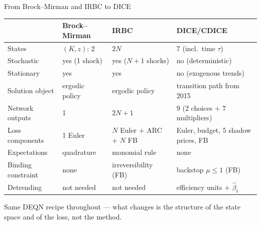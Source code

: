 \documentclass[aspectratio=169,11pt]{beamer}
\newcommand{\emphc}[1]{\textcolor{harvardcrimson}{#1}}
\begin{document}
\begin{frame}{From Brock--Mirman and IRBC to DICE}
\begin{center}
\footnotesize
\setlength{\tabcolsep}{4pt}
\begin{tabular}{llll}
\toprule
& \textbf{Brock--Mirman} & \textbf{IRBC} & \textbf{DICE/CDICE} \\
\midrule
States & $(K, z)$: 2 & $2N$ & 7 (incl.\ time $\tau$) \\
Stochastic & yes (1 shock) & yes ($N+1$ shocks) & \emphc{no} (deterministic) \\
Stationary & yes & yes & \emphc{no} (exogenous trends) \\
Solution object & ergodic policy & ergodic policy & \emphc{transition path from 2015} \\
Network outputs & 1 & $2N+1$ & 9 (2 choices $+$ 7 multipliers) \\
Loss components & 1 Euler & $N$ Euler $+$ ARC $+$ $N$ FB & Euler, budget, \emphc{5 shadow prices}, FB \\
Expectations & quadrature & monomial rule & \emphc{none} \\
Binding constraint & none & irreversibility (FB) & backstop $\mu \leq 1$ (FB) \\
Detrending & not needed & not needed & \emphc{efficiency units $+$ $\hat{\beta}_t$} \\
\bottomrule
\end{tabular}
\end{center}

\vspace{0.3em}
{\small Same DEQN recipe throughout --- what changes is the \emphc{structure of the state space and of the loss}, not the method.}
\end{frame}
\end{document}
